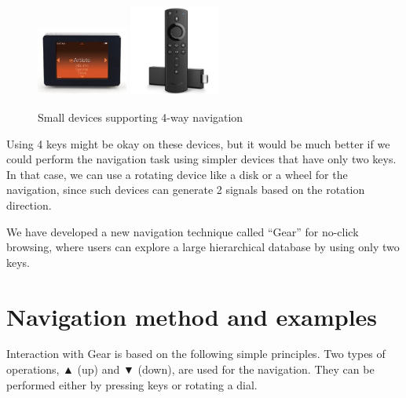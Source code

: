 \documentclass[conference]{IEEEtran}
\def\up{▲}
\def\down{▼}
\begin{document}
\begin{figure}[H]
\centerline{
  \includegraphics[width=30mm,bb=0 0 333 250]{figures/0048a5e91ddcf1d5670bd958e3c55619.jpg}
  \includegraphics[width=30mm,bb=0 0 551 551]{figures/70c036b24525c6cace9955b24152e97e.jpg}
  }
\caption{Small devices supporting 4-way navigation}
\label{rio}
\end{figure}

Using 4 keys might be okay on these devices, but it would be much better
if we could perform the navigation task using simpler devices that have only two keys.
In that case, we can use a rotating device like a disk or a wheel for the navigation,
since such devices can generate 2 signals based on the rotation direction.

We have developed a new navigation technique called ``{Gear}'' for no-click browsing,
where users can explore a large hierarchical database by using only two keys.


\section{Navigation method and examples}
\label{navigation}

Interaction with Gear is based on the following simple principles.
Two types of operations,
{\up} (up) and {\down} (down), are used for the navigation.
They can be performed either by pressing keys or rotating a dial.
\end{document}
